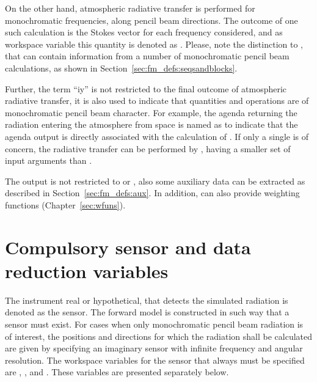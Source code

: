 On the other hand, atmospheric radiative transfer is performed for
monochromatic frequencies, along pencil beam directions. The outcome of one
such calculation is the Stokes vector for each frequency considered, and as
workspace variable this quantity is denoted as . Please, note the
distinction to , that can contain information from a number of
monochromatic pencil beam calculations, as shown in
Section~\ref{sec:fm_defs:seqsandblocks}.

Further, the term ``iy'' is not restricted to the final outcome of atmospheric
radiative transfer, it is also used to indicate that quantities and operations
are of monochromatic pencil beam character. For example, the agenda returning
the radiation entering the atmosphere from space is named as
 to indicate that the agenda output is directly
associated with the calculation of . If only a single
 is of concern, the radiative transfer can be performed by
, having a smaller set of input arguments than
.

The output is not restricted to  or , also some
auxiliary data can be extracted as described in Section~\ref{sec:fm_defs:aux}.
In addition,  can also provide weighting functions
(Chapter~\ref{sec:wfuns}).








\section{Compulsory sensor and data reduction variables}
\label{sec:fm_defs:sensor1}

The instrument real or hypothetical, that detects the simulated radiation is
denoted as the sensor. The forward model is constructed in
such way that a sensor must exist. For cases when only monochromatic pencil
beam radiation is of interest, the positions and directions for which the
radiation shall be calculated are given by specifying an imaginary sensor with
infinite frequency and angular resolution. The workspace variables for the
sensor that always must be specified are ,
,  and
. These variables are presented separately
below.


